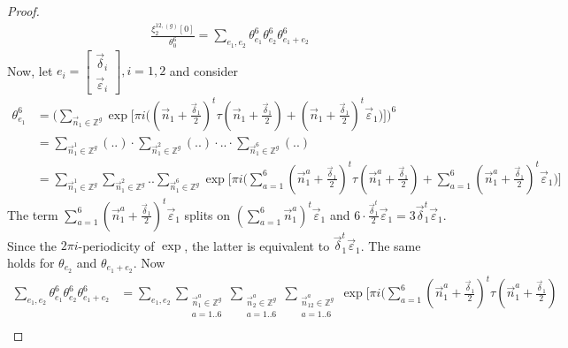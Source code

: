 \documentclass{article}
\newcommand{\ZZ}{\mathbb{Z}}
\newcommand{\ch}[2]{\left[\begin{array}{c}#1\\ #2 \end{array}\right]}
\newcommand{\de}{\delta}
\newcommand{\ep}{\varepsilon}
\theoremstyle{plain}
\theoremstyle{definition}
\begin{document}
    \begin{proof}
        \begin{align}
            \frac{\xi_2^{12, (g)}[0]}{\theta_0^6} = 
                \sum_{e_1, e_2} \theta^6_{e_1} \theta^6_{e_2} \theta^6_{e_1+e_2}
        \end{align}
        Now, let $e_i = \ch{{\vec{\de}}_i}{{\vec{\ep}}_i}, i=1,2$ and consider
        \begin{align}
            \theta^6_{e_1} 
            &= \Big( \sum_{\vec{n}_1 \in \ZZ^g} \exp \big[ \pi i \big( 
                (\vec{n}_1 + \frac{{\vec{\de}}_1}{2})^t \tau (\vec{n}_1 + \frac{{\vec{\de}}_1}{2}) + 
                (\vec{n}_1 + \frac{{\vec{\de}}_1}{2})^t {\vec{\ep}}_1
                \big)
            \big] \Big)^6 \\
            &= \sum_{\vec{n}_1^1 \in \ZZ^g} (..) \cdot 
                \sum_{\vec{n}_1^2 \in \ZZ^g} (..) \cdot .. \cdot 
                \sum_{\vec{n}_1^6 \in \ZZ^g} (..) \\
            &= \sum_{\vec{n}_1^1 \in \ZZ^g}
                \sum_{\vec{n}_1^2 \in \ZZ^g} ..
                \sum_{\vec{n}_1^6 \in \ZZ^g} 
                \exp \big[ \pi i \big( 
                \sum_{a=1}^6 (\vec{n}_1^a + \frac{{\vec{\de}}_1}{2})^t \tau (\vec{n}_1^a + \frac{{\vec{\de}}_1}{2}) + 
                \sum_{a=1}^6 (\vec{n}_1^a + \frac{{\vec{\de}}_1}{2})^t {\vec{\ep}}_1
                \big) \big]
        \end{align}
        The term $\sum_{a=1}^6(\vec{n}_1^a+\frac{{\vec{\de}}_1}{2})^t {\vec{\ep}}_1$ splits on 
        $(\sum_{a=1}^6 \vec{n}_1^a)^t {\vec{\ep}}_1$ and 
        $6 \cdot \frac{{\vec{\de}}_1^t}{2} {\vec{\ep}}_1=3 {\vec{\de}}_1^t {\vec{\ep}}_1$.
        Since the $2\pi i$-periodicity of $\exp$, the latter is equivalent to ${\vec{\de}}_1^t{\vec{\ep}}_1$.
        The same holds for $\theta_{e_2}$ and $\theta_{e_1+e_2}$.
        Now
        \begin{align}
            \sum_{e_1, e_2} \theta^6_{e_1} \theta^6_{e_2} \theta^6_{e_1+e_2}
            &= \sum_{e_1, e_2} 
            \sum_{\substack{\vec{n}_1^a \in \ZZ^g \\ a=1..6}}
            \sum_{\substack{\vec{n}_2^a \in \ZZ^g \\ a=1..6}}
            \sum_{\substack{\vec{n}_{12}^a \in \ZZ^g \\ a=1..6}}
            \exp \Big [ \pi i \Big (
                \sum_{a=1}^6 (\vec{n}_1^a+\frac{{\vec{\de}}_1}{2})^t \tau (\vec{n}_1^a+\frac{{\vec{\de}}_1}{2}) \nonumber \\

\end{align}
\end{proof}
\end{document}
